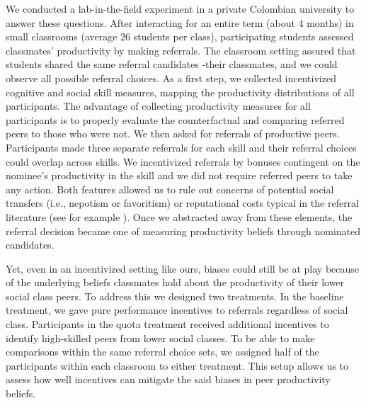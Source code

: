 \documentclass[11pt,a4paper,oneside]{article}
\begin{document}
We conducted a lab-in-the-field experiment in a private Colombian university to answer these questions. After interacting for an entire term (about 4 months) in small classrooms (average 26 students per class), participating students assessed classmates' productivity by making referrals. The classroom setting assured that students shared the same referral candidates -their classmates, and we could observe all possible referral choices. As a first step, we collected incentivized cognitive and social skill measures, mapping the productivity distributions of all participants. The advantage of collecting productivity measures for all participants is to properly evaluate the counterfactual and comparing referred peers to those who were not. We then asked for referrals of productive peers. Participants made three separate referrals for each skill and their referral choices could overlap across skills. We incentivized referrals by bonuses contingent on the nominee's productivity in the skill and we did not require referred peers to take any action. Both features allowed us to rule out concerns of potential social transfers (i.e., nepotism or favoritism) or reputational costs typical in the referral literature (see for example \citet{bandiera2009social,beaman_who_2012,witte2021workers}). Once we abstracted away from these elements, the referral decision became one of measuring productivity beliefs through nominated candidates. 

Yet, even in an incentivized setting like ours, biases could still be at play because of the underlying beliefs classmates hold about the productivity of their lower social class peers. To address this we designed two treatments. In the baseline treatment, we gave pure performance incentives to referrals regardless of social class. Participants in the quota treatment received additional incentives to identify high-skilled peers from lower social classes. To be able to make comparisons within the same referral choice sets, we assigned half of the participants within each classroom to either treatment. This setup allows us to assess how well incentives can mitigate the said biases in peer productivity beliefs.
\end{document}

